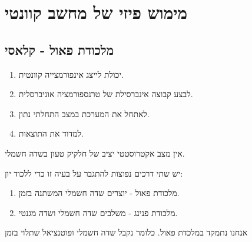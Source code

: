 \documentclass{tstextbook}
\begin{document}
\chapter{מימוש פיזי של מחשב קוונטי}

\section{מלכודת פאול - קלאסי}

\begin{reminder}
  \begin{enumerate}
    \item יכולת לייצג אינפורמצייה קוונטית. 


    \item לבצע קבוצה אינברסילת של טרנספורמציה אוניברסלית. 


    \item לאתחל את המערכת במצב התחלתי נתון. 


    \item למדוד את התוצאות. 


  \end{enumerate}
\end{reminder}
\begin{reminder}
אין מצב אקטרוסטטי יציב של חלקיק טעון בשדה חשמלי.

\end{reminder}
\begin{proposition}
יש שתי דרכים נפוצות להתגבר על בעיה זו כדי ללכוד יון:

  \begin{enumerate}
    \item מלכודת פאול - יוצרים שדה חשמלי המשתנה בזמן. 


    \item מלכודת פנינג - משלבים שדה חשמלי ושדה מגנטי. 


  \end{enumerate}
\end{proposition}
אנחנו נתמקד במלכדת פאול. כלומר נקבל שדה חשמלי ופוטנציאל שתלוי בזמן
\end{document}
